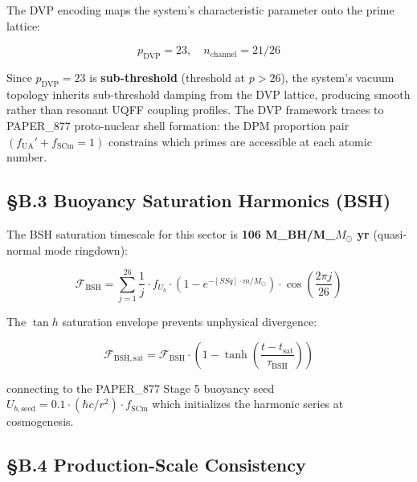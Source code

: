 \documentclass[12pt,a4paper]{article}
\begin{document}
The DVP encoding maps the system's characteristic parameter onto the prime lattice:

\begin{equation}
p_{\mathrm{DVP}} = 23, \quad n_{\mathrm{channel}} = 21/26
\end{equation}

Since $p_{\mathrm{DVP}} = 23$ is \textbf{sub-threshold} (threshold at $p > 26$), the system's vacuum topology inherits sub-threshold damping from the DVP lattice, producing smooth rather than resonant UQFF coupling profiles. The DVP framework traces to PAPER\_877 proto-nuclear shell formation: the DPM proportion pair $(f_{\mathrm{UA}}' + f_{\mathrm{SCm}} = 1)$ constrains which primes are accessible at each atomic number.

\subsection{\S{}B.3 Buoyancy Saturation Harmonics (BSH)}

The BSH saturation timescale for this sector is \textbf{106 M\_BH/M\_{$M_{\odot}$} yr} (quasi-normal mode ringdown):

\begin{equation}
\mathcal{F}_{\mathrm{BSH}} = \sum_{j=1}^{26} \frac{1}{j} \cdot f_U_b \cdot \left(1 - e^{-[SSq] \cdot m/M_\odot}\right) \cdot \cos\!\left(\frac{2\pi j}{26}\right)
\end{equation}

The $\tan h$ saturation envelope prevents unphysical divergence:

\begin{equation}
\mathcal{F}_{\mathrm{BSH,sat}} = \mathcal{F}_{\mathrm{BSH}} \cdot \left(1 - \tanh\!\left(\frac{t - t_{\mathrm{sat}}}{\tau_{\mathrm{BSH}}}\right)\right)
\end{equation}

connecting to the PAPER\_877 Stage 5 buoyancy seed $U_{b,\mathrm{seed}} = 0.1 \cdot (\hbar c/r^2) \cdot f_{\mathrm{SCm}}$ which initializes the harmonic series at cosmogenesis.

\subsection{\S{}B.4 Production-Scale Consistency}
\end{document}
